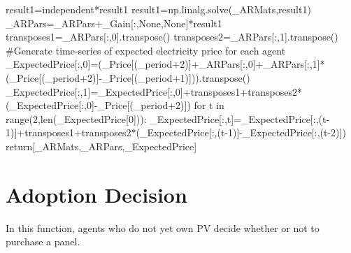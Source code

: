 \documentclass[
  letterpaper,
  DIV=11,
  numbers=noendperiod]{scrartcl}
\newenvironment{Shaded}{\begin{snugshade}}{\end{snugshade}}
\newcommand{\BuiltInTok}[1]{\textcolor[rgb]{0.00,0.23,0.31}{#1}}
\newcommand{\CommentTok}[1]{\textcolor[rgb]{0.37,0.37,0.37}{#1}}
\newcommand{\ControlFlowTok}[1]{\textcolor[rgb]{0.00,0.23,0.31}{#1}}
\newcommand{\DecValTok}[1]{\textcolor[rgb]{0.68,0.00,0.00}{#1}}
\newcommand{\KeywordTok}[1]{\textcolor[rgb]{0.00,0.23,0.31}{#1}}
\newcommand{\NormalTok}[1]{\textcolor[rgb]{0.00,0.23,0.31}{#1}}
\newcommand{\OperatorTok}[1]{\textcolor[rgb]{0.37,0.37,0.37}{#1}}
\newcommand{\VariableTok}[1]{\textcolor[rgb]{0.07,0.07,0.07}{#1}}
\begin{document}
\begin{Shaded}
\begin{Highlighting}[]
\NormalTok{    result1}\OperatorTok{=}\NormalTok{independent}\OperatorTok{*}\NormalTok{result1}
\NormalTok{    result1}\OperatorTok{=}\NormalTok{np.linalg.solve(\_ARMats,result1)}
\NormalTok{    \_ARPars}\OperatorTok{=}\NormalTok{\_ARPars}\OperatorTok{+}\NormalTok{\_Gain[:,}\VariableTok{None}\NormalTok{,}\VariableTok{None}\NormalTok{]}\OperatorTok{*}\NormalTok{result1}
\NormalTok{    transposes1}\OperatorTok{=}\NormalTok{\_ARPars[:,}\DecValTok{0}\NormalTok{].transpose()}
\NormalTok{    transposes2}\OperatorTok{=}\NormalTok{\_ARPars[:,}\DecValTok{1}\NormalTok{].transpose()}
    \CommentTok{\#Generate time{-}series of expected electricity price for each agent}
\NormalTok{    \_ExpectedPrice[:,}\DecValTok{0}\NormalTok{]}\OperatorTok{=}\NormalTok{(\_Price[(\_period}\OperatorTok{+}\DecValTok{2}\NormalTok{)]}\OperatorTok{+}\NormalTok{\_ARPars[:,}\DecValTok{0}\NormalTok{]}\OperatorTok{+}\NormalTok{\_ARPars[:,}\DecValTok{1}\NormalTok{]}\OperatorTok{*}\NormalTok{(\_Price[(\_period}\OperatorTok{+}\DecValTok{2}\NormalTok{)]}\OperatorTok{{-}}\NormalTok{\_Price[(\_period}\OperatorTok{+}\DecValTok{1}\NormalTok{)])).transpose()}
\NormalTok{    \_ExpectedPrice[:,}\DecValTok{1}\NormalTok{]}\OperatorTok{=}\NormalTok{\_ExpectedPrice[:,}\DecValTok{0}\NormalTok{]}\OperatorTok{+}\NormalTok{transposes1}\OperatorTok{+}\NormalTok{transposes2}\OperatorTok{*}\NormalTok{(\_ExpectedPrice[:,}\DecValTok{0}\NormalTok{]}\OperatorTok{{-}}\NormalTok{\_Price[(\_period}\OperatorTok{+}\DecValTok{2}\NormalTok{)])}
    \ControlFlowTok{for}\NormalTok{ t }\KeywordTok{in} \BuiltInTok{range}\NormalTok{(}\DecValTok{2}\NormalTok{,}\BuiltInTok{len}\NormalTok{(\_ExpectedPrice[}\DecValTok{0}\NormalTok{])):}
\NormalTok{        \_ExpectedPrice[:,t]}\OperatorTok{=}\NormalTok{\_ExpectedPrice[:,(t}\OperatorTok{{-}}\DecValTok{1}\NormalTok{)]}\OperatorTok{+}\NormalTok{transposes1}\OperatorTok{+}\NormalTok{transposes2}\OperatorTok{*}\NormalTok{(\_ExpectedPrice[:,(t}\OperatorTok{{-}}\DecValTok{1}\NormalTok{)]}\OperatorTok{{-}}\NormalTok{\_ExpectedPrice[:,(t}\OperatorTok{{-}}\DecValTok{2}\NormalTok{)])}
    \ControlFlowTok{return}\NormalTok{[\_ARMats,\_ARPars,\_ExpectedPrice]}
\end{Highlighting}
\end{Shaded}

\hypertarget{adoption-decision}{%
\section{Adoption Decision}\label{adoption-decision}}

In this function, agents who do not yet own PV decide whether or not to
purchase a panel.
\end{document}
